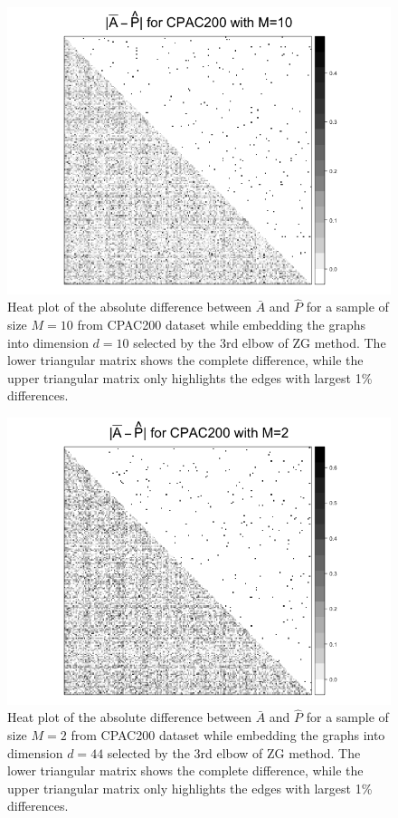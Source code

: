 \documentclass[a4paper]{article}
\begin{document}
\begin{figure}[!htb]
\centering
\includegraphics[width=1\textwidth]{Diff_CPAC200_m10.png}
\caption{Heat plot of the absolute difference between $\bar{A}$ and $\hat{P}$ for a sample of size $M=10$ from CPAC200 dataset while embedding the graphs into dimension $d=10$ selected by the 3rd elbow of ZG method. The lower triangular matrix shows the complete difference, while the upper triangular matrix only highlights the edges with largest 1\% differences.}
\label{fig:Diff_CPAC200_m10}
\end{figure}

\begin{figure}[!htb]
\centering
\includegraphics[width=1\textwidth]{Diff_CPAC200_m2.png}
\caption{Heat plot of the absolute difference between $\bar{A}$ and $\hat{P}$ for a sample of size $M=2$ from CPAC200 dataset while embedding the graphs into dimension $d=44$ selected by the 3rd elbow of ZG method. The lower triangular matrix shows the complete difference, while the upper triangular matrix only highlights the edges with largest 1\% differences.}
\label{fig:Diff_CPAC200_m2}
\end{figure}
\end{document}
